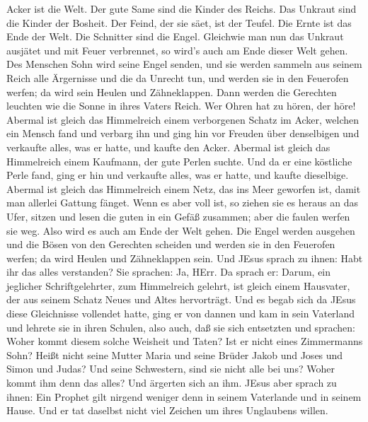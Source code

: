 Acker ist die Welt. Der gute Same sind die Kinder des Reichs. Das
Unkraut sind die Kinder der Bosheit.  Der Feind, der sie
säet, ist der Teufel. Die Ernte ist das Ende der Welt. Die Schnitter
sind die Engel.  Gleichwie man nun das Unkraut ausjätet und
mit Feuer verbrennet, so wird's auch am Ende dieser Welt gehen.
 Des Menschen Sohn wird seine Engel senden, und sie werden
sammeln aus seinem Reich alle Ärgernisse und die da Unrecht tun,
 und werden sie in den Feuerofen werfen; da wird sein
Heulen und Zähneklappen.  Dann werden die Gerechten
leuchten wie die Sonne in ihres Vaters Reich. Wer Ohren hat zu hören,
der höre!  Abermal ist gleich das Himmelreich einem
verborgenen Schatz im Acker, welchen ein Mensch fand und verbarg ihn und
ging hin vor Freuden über denselbigen und verkaufte alles, was er hatte,
und kaufte den Acker.  Abermal ist gleich das Himmelreich
einem Kaufmann, der gute Perlen suchte.  Und da er eine
köstliche Perle fand, ging er hin und verkaufte alles, was er hatte, und
kaufte dieselbige.  Abermal ist gleich das Himmelreich
einem Netz, das ins Meer geworfen ist, damit man allerlei Gattung
fänget.  Wenn es aber voll ist, so ziehen sie es heraus an
das Ufer, sitzen und lesen die guten in ein Gefäß zusammen; aber die
faulen werfen sie weg.  Also wird es auch am Ende der Welt
gehen. Die Engel werden ausgehen und die Bösen von den Gerechten
scheiden  und werden sie in den Feuerofen werfen; da wird
Heulen und Zähneklappen sein.  Und JEsus sprach zu ihnen:
Habt ihr das alles verstanden? Sie sprachen: Ja, HErr.  Da
sprach er: Darum, ein jeglicher Schriftgelehrter, zum Himmelreich
gelehrt, ist gleich einem Hausvater, der aus seinem Schatz Neues und
Altes hervorträgt.  Und es begab sich da JEsus diese
Gleichnisse vollendet hatte, ging er von dannen  und kam in
sein Vaterland und lehrete sie in ihren Schulen, also auch, daß sie sich
entsetzten und sprachen: Woher kommt diesem solche Weisheit und Taten?
 Ist er nicht eines Zimmermanns Sohn? Heißt nicht seine
Mutter Maria und seine Brüder Jakob und Joses und Simon und Judas?
 Und seine Schwestern, sind sie nicht alle bei uns? Woher
kommt ihm denn das alles?  Und ärgerten sich an ihm. JEsus
aber sprach zu ihnen: Ein Prophet gilt nirgend weniger denn in seinem
Vaterlande und in seinem Hause.  Und er tat daselbst nicht
viel Zeichen um ihres Unglaubens willen.

